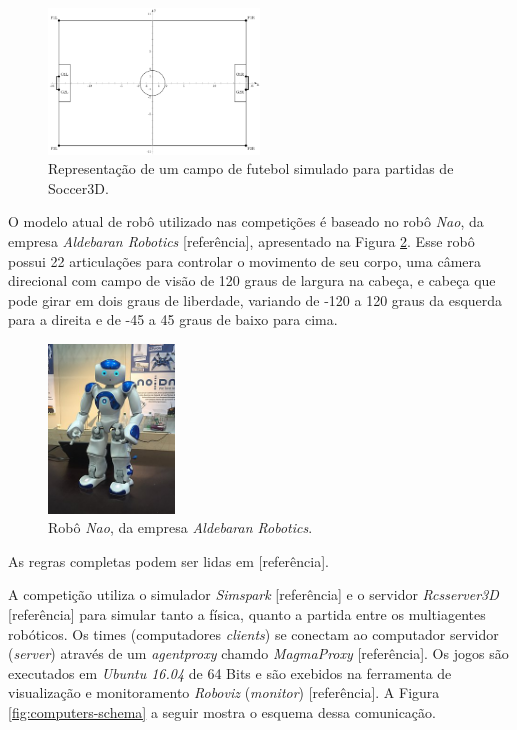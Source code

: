 \documentclass[a4paper,12pt]{article}
\begin{document}
\begin{figure}[H]
	\centering
	\includegraphics[width=0.5\textwidth]{figures/soccer3d-field.png}
   \caption{Representação de um campo de futebol simulado para partidas de Soccer3D.} \label{fig:soccer3d_field}
\end{figure}

O modelo atual de robô utilizado nas competições é baseado no robô \textit{Nao}, da empresa \textit{Aldebaran Robotics} [referência], apresentado na Figura \ref{fig:nao_robot}. Esse robô possui 22 articulações para controlar o movimento de seu corpo, uma câmera direcional com campo de visão de 120 graus de largura na cabeça, e cabeça que pode girar em dois graus de liberdade, variando de -120 a 120 graus da esquerda para a direita e de -45 a 45 graus de baixo para cima.

\begin{figure}[H]
	\centering
	\includegraphics[width=0.3\textwidth]{figures/nao-robot.jpg}
   \caption{Robô \textit{Nao}, da empresa \textit{Aldebaran Robotics}.} \label{fig:nao_robot}
\end{figure}

As regras completas podem ser lidas em [referência]\cite{cbr2008}.

A competição utiliza o simulador \textit{Simspark} [referência] e o servidor \textit{Rcsserver3D} [referência] para simular tanto a física, quanto a partida entre os multiagentes robóticos. Os times (computadores \textit{clients}) se conectam ao computador servidor (\textit{server}) através de um \textit{agentproxy} chamdo \textit{MagmaProxy} [referência]. Os jogos são executados em \textit{Ubuntu 16.04} de 64 Bits e são exebidos na ferramenta de visualização e monitoramento \textit{Roboviz} (\textit{monitor}) [referência]. A Figura \ref{fig:computers-schema} a seguir mostra o esquema dessa comunicação.
\end{document}
